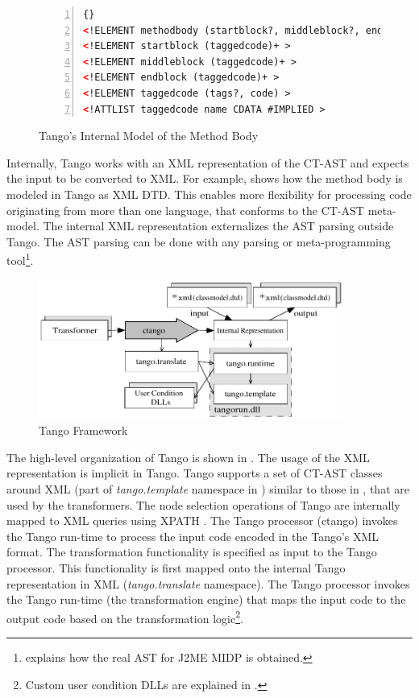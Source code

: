 \begin{figure}[ht]
	\centering
	\begin{minipage}[b]{12cm}
	\begin{center}	
\begin{scriptsize}
\begin{lstlisting}[numbers=left,language=XML,frame=leftline]{}
<!ELEMENT methodbody (startblock?, middleblock?, endblock?) >
<!ELEMENT startblock (taggedcode)+ >
<!ELEMENT middleblock (taggedcode)+ >
<!ELEMENT endblock (taggedcode)+ >
<!ELEMENT taggedcode (tags?, code) >
<!ATTLIST taggedcode name CDATA #IMPLIED >
		\end{lstlisting}
		\end{scriptsize}
	\end{center}
	\caption{Tango's Internal Model of the Method Body}
	\label{c4f:tango.model}
	\end{minipage}	
\end{figure}

Internally, Tango works with an XML \cite{skonnardetal.01} representation of the CT-AST and expects the input to be converted to XML. For example,  shows how the method body is modeled in Tango as XML DTD. This enables more flexibility for processing code originating from more than one language, that conforms to the CT-AST meta-model. The internal XML representation externalizes the AST parsing outside Tango. The AST parsing can be done with any parsing or meta-programming tool\footnote{ explains how the real AST for J2ME MIDP is obtained.}.

\begin{figure}[ht]
		\centering
		\includegraphics[width=10cm,height=!]{ch04/tango}
	\caption{Tango Framework}
	\label{fig:tango}
\end{figure}

The high-level organization of Tango is shown in . The usage of the XML representation is implicit in Tango. Tango supports a set of CT-AST classes around XML (part of \textit{tango.template} namespace in ) similar to those in , that are used by the transformers. The node selection operations of Tango are internally mapped to XML queries using XPATH \cite{url.xpath}. The Tango processor (ctango) invokes the Tango run-time to process the input code encoded in the Tango's XML format. The transformation functionality is specified as input to the Tango processor. This functionality is first mapped onto the internal Tango representation in XML (\textit{tango.translate} namespace). The Tango processor invokes the Tango run-time (the transformation engine) that maps the input code to the output code based on the transformation logic\footnote{Custom user condition DLLs are explained in .}.


